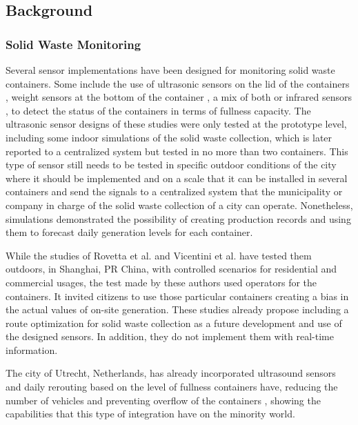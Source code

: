 \documentclass[authoryear,preprint,review,12pt]{elsarticle}
\begin{document}
    \subsection{Background}
    \label{subsec:Background}
    \subsubsection{Solid Waste Monitoring}
    \label{subsubsec:Monitoring}
    Several sensor implementations have been designed for monitoring solid waste containers. Some include the use of ultrasonic sensors on the lid of the containers \citep{Chaudhari2018, Joshi2022, Karthik2021, Mahajan2017, Ramson2017}, weight sensors at the bottom of the container \citep{Rovetta2009}, a mix of both \citep{Ali2020, Vicentini2009} or infrared sensors \citep{Singh2016}, to detect the status of the containers in terms of fullness capacity. The ultrasonic sensor designs of these studies were only tested at the prototype level, including some indoor simulations of the solid waste collection, which is later reported to a centralized system but tested in no more than two containers. This type of sensor still needs to be tested in specific outdoor conditions of the city where it should be implemented and on a scale that it can be installed in several containers and send the signals to a centralized system that the municipality or company in charge of the solid waste collection of a city can operate. Nonetheless, \citet{Ali2020} simulations demonstrated the possibility of creating production records and using them to forecast daily generation levels for each container.

    While the studies of Rovetta et al. and Vicentini et al. have tested them outdoors, in Shanghai, PR China, with controlled scenarios for residential and commercial usages, the test made by these authors used operators for the containers. It invited citizens to use those particular containers creating a bias in the actual values of on-site generation. These studies already propose including a route optimization for solid waste collection as a future development and use of the designed sensors. In addition, they do not implement them with real-time information.

    The city of Utrecht, Netherlands, has already incorporated ultrasound sensors and daily rerouting based on the level of fullness containers have, reducing the number of vehicles and preventing overflow of the containers \citep{utrechtUndergroundContainersMunicipality2021}, showing the capabilities that this type of integration have on the minority world.
\end{document}
